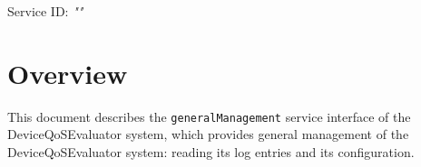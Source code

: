 \documentclass[a4paper]{arrowhead}
\begin{document}
\sloppy

\ArrowheadSetup

\begin{center}
  \vspace*{1cm}
  \huge{\arrowtitle}

  \vspace*{0.2cm}
  \LARGE{\arrowtype}
  \vspace*{1cm}

  \Large{Service ID: \textit{"\arrowid"}}

  \vspace*{\fill}


  \vspace*{1cm}
  \vspace*{\fill}

  \begin{abstract}
    This document describes the HTTP/1.1 protocol with TLS payload security and JSON payload encoding variant of the \texttt{generalManagement} service of the DeviceQoSEvaluator system.
  \end{abstract}

  \vspace*{1cm}
\end{center}

\newpage

\tableofcontents
\newpage

\section{Overview}
\label{sec:overview}

This document describes the \texttt{generalManagement} service interface of the DeviceQoSEvaluator system, which provides general management of the Device\allowbreak{}Qo\allowbreak{}SEvaluator system: reading its log entries and its configuration.
\end{document}
